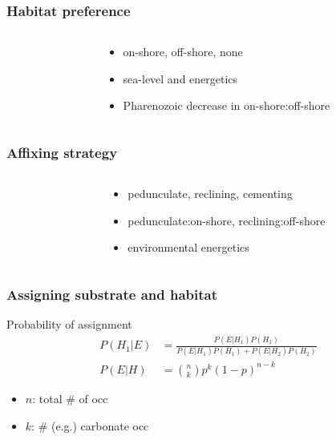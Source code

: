 \documentclass{beamer} \usepackage{amsmath,amsthm}
\begin{document}
\begin{frame}
  \frametitle{Habitat preference}

  \begin{columns}
    \begin{column}{0.5\textwidth}
    \end{column}
    \begin{column}{0.5\textwidth}
      \begin{itemize}
        \item on-shore, off-shore, none
        \item sea-level and energetics
        \item Pharenozoic decrease in on-shore:off-shore
      \end{itemize}
    \end{column}
  \end{columns}
\end{frame}

\begin{frame}
  \frametitle{Affixing strategy}

  \begin{columns}
    \begin{column}{0.5\textwidth}
    \end{column}
    \begin{column}{0.5\textwidth}
      \begin{itemize}
        \item pedunculate, reclining, cementing
        \item pedunculate:on-shore, reclining:off-shore
        \item environmental energetics
      \end{itemize}
    \end{column}
  \end{columns}
\end{frame}

\begin{frame}
  \frametitle{Assigning substrate and habitat}

  \begin{block}{Probability of assignment}
    \begin{align*}
      P(H_{1}|E) &= \frac{P(E|H_{1})P(H_{1})}{P(E|H_{1})P(H_{1}) + P(E|H_{2})P(H_{2})} \\
      P(E|H) &= \binom{n}{k} p^{k}(1 - p)^{n - k}
    \end{align*}

    \begin{itemize}
      \item \(n\): total \# of occ
      \item \(k\): \# (e.g.) carbonate occ
    \end{itemize}

    \tiny{}
  \end{block}
\end{frame}
\end{document}

